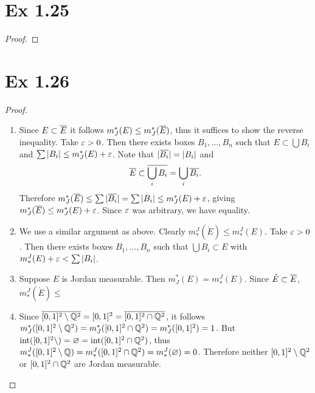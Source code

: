 \documentclass[hw_all.tex]{subfiles}
\begin{document}
\section*{Ex 1.25}

\begin{proof}
    
\end{proof}

\section*{Ex 1.26}

\begin{proof}
    \hfill
    \begin{enumerate}[label=\roman*)]
        \item Since $E \subset \overline{E}$ it follows $m_J^*(E) \leq m_J^*(\overline{E})$, thus it suffices to show the reverse inequality. Take $\varepsilon > 0$. Then there exists boxes $B_1, \ldots, B_n$ such that $E \subset \bigcup B_i$ and $\sum |B_i| \leq m_J^*(E) + \varepsilon$. Note that $|\overline{B_i}| = |B_i|$ and
        \[
            \overline{E} \subset \overline{\bigcup_i B_i} = \bigcup_i \overline{B_i}
        .\]
        Therefore $m_J^*(\overline{E}) \leq \sum |\overline{B_i}| = \sum |B_i| \leq m_J^*(E) + \varepsilon$, giving $m_J^*(\overline{E}) \leq m_J^*(E) + \varepsilon$. Since $\varepsilon$ was arbitrary, we have equality.

        \item We use a similar argument as above. Clearly $m^J_*(\mathring{E}) \leq m^J_*(E)$. Take $\varepsilon > 0$. Then there exists boxes $B_1, \ldots, B_n$ such that $\bigcup B_i \subset E$ with $m^J_*(E) + \varepsilon < \sum |B_i|$.

        \item Suppose $E$ is Jordan measurable. Then $m_J^*(E) = m^J_*(E)$. Since $\mathring{E} \subset \overline{E}$, $m^J_*(\mathring{E}) \leq $

        \item Since $\overline{[0,1]^2 \setminus \mathbb{Q}^2} = [0,1]^2 = \overline{[0,1]^2 \cap \mathbb{Q}^2}$, it follows $m_J^*([0,1]^2 \setminus \mathbb{Q}^2) = m_J^*([0,1]^2 \cap \mathbb{Q}^2) = m_J^*([0,1]^2) = 1$. But $\operatorname{int}([0,1]^2 \setminus) = \varnothing = \operatorname{int}([0,1]^2 \cap \mathbb{Q}^2)$, thus $m^J_*([0,1]^2 \setminus \mathbb{Q}) = m^J_*([0,1]^2 \cap \mathbb{Q}^2) = m^J_*(\varnothing) = 0$. Therefore neither $[0,1]^2 \setminus \mathbb{Q}^2$ or $[0,1]^2 \cap \mathbb{Q}^2$ are Jordan measurable.
    \end{enumerate}
\end{proof}
\end{document}
